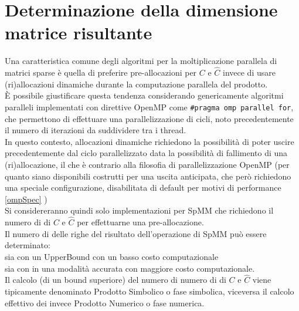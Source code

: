 \section{Determinazione della dimensione matrice risultante} \label{ChExistingTecqs:symbMul}
Una caratteristica comune degli algoritmi per la moltiplicazione parallela di matrici sparse è 
quella di preferire pre-allocazioni per $C$ e $\hat{C}$ 
invece di usare (ri)allocazioni dinamiche durante la computazione parallela del prodotto.\\
È possibile giustificare questa tendenza considerando genericamente algoritmi paralleli implementati con 
\label{ChExistingTecqs:openMP_for_philosophy}
direttive OpenMP come \verb|#pragma omp parallel for|, che permettono di effettuare una 
parallelizzazione di cicli, noto precedentemente il numero di iterazioni da suddividere tra i thread. \\
In questo contesto, allocazioni dinamiche richiedono la possibilità di poter uscire precedentemente dal ciclo parallelizzato
data la possibilità di fallimento di una (ri)allocazione, il che è contrario alla filosofia di parallelizzazione OpenMP
(per quanto siano disponibili costrutti per una uscita anticipata, che però richiedono una speciale configurazione, disabilitata di default per 
 motivi di performance \ref{ompSpec} )\\
Si considereranno quindi solo implementazioni per SpMM che richiedono il numero di \nnz di $C$ e $\hat{C}$ per 
effettuarne una pre-allocazione.\\

Il numero di \nnz delle righe del risultato dell'operazione di SpMM può essere determinato:\\ %
sia con un UpperBound con un basso costo computazionale \\ %
sia con in una modalità accurata con maggiore costo computazionale.\\ %

\label{ChExistingTecqs:spMM_symb_num_naming}
Il calcolo (di un bound superiore) del numero di numero di \nnz di $C$ e $\hat{C}$ viene tipicamente 
denominato Prodotto Simbolico o fase simbolica, 
viceversa il calcolo effettivo dei \nnz invece Prodotto Numerico o fase numerica.\\

